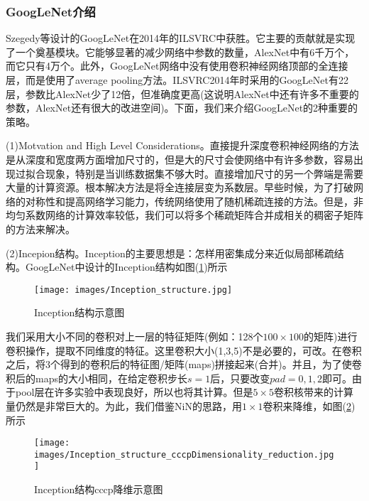         \subsubsection{GoogLeNet介绍}
            \par
            Szegedy等设计的GoogLeNet\cite{2014.Christian}在2014年的ILSVRC中获胜。它主要的贡献就是实现了一个奠基模块。它能够显著的减少网络中参数的数量，AlexNet中有6千万个，而它只有4万个。此外，GoogLeNet网络中没有使用卷积神经网络顶部的全连接层，而是使用了average pooling方法。ILSVRC2014年时采用的GoogLeNet有22层，参数比AlexNet少了12倍，但准确度更高(这说明AlexNet中还有许多不重要的参数，AlexNet还有很大的改进空间)。下面，我们来介绍GoogLeNet的2种重要的策略。
            \par
            (1)Motvation and High Level Considerations。直接提升深度卷积神经网络的方法是从深度和宽度两方面增加尺寸的，但是大的尺寸会使网络中有许多参数，容易出现过拟合现象，特别是当训练数据集不够大时。直接增加尺寸的另一个弊端是需要大量的计算资源。根本解决方法是将全连接层变为系数层。早些时候，为了打破网络的对称性和提高网络学习能力，传统网络使用了随机稀疏连接的方法。但是，非均匀系数网络的计算效率较低，我们可以将多个稀疏矩阵合并成相关的稠密子矩阵的方法来解决。
            \par
            (2)Incepion结构。Inception的主要思想是：怎样用密集成分来近似局部稀疏结构。GoogLeNet\cite{2014.Christian}中设计的Inception结构如图(\ref{fig:Inception结构示意图})所示
             \begin{figure}[H]
            \centering
            \texttt{[image: images/Inception\_structure.jpg]}
            \caption{Inception结构示意图}
            \label{fig:Inception结构示意图}
            \end{figure}
            \par
            我们采用大小不同的卷积对上一层的特征矩阵(例如：128个$100\times 100$的矩阵)进行卷积操作，提取不同维度的特征。这里卷积大小(1,3,5)不是必要的，可改。在卷积之后，将3个得到的卷积后的特征图/矩阵(maps)拼接起来(合并)。并且，为了使卷积后的maps的大小相同，在给定卷积步长$s=1$后，只要改变$pad=0,1,2$即可。由于pool层在许多实验中表现良好，所以也将其计算。但是$5\times 5$卷积核带来的计算量仍然是非常巨大的。为此，我们借鉴NiN的思路，用$1\times 1$卷积来降维，如图(\ref{fig:Inception结构cccp降维示意图})所示\\
             \begin{figure}[H]
            \centering
            \texttt{[image: images/Inception\_structure\_cccpDimensionality\_reduction.jpg]}
            \caption{Inception结构cccp降维示意图}
            \label{fig:Inception结构cccp降维示意图}
            \end{figure}
